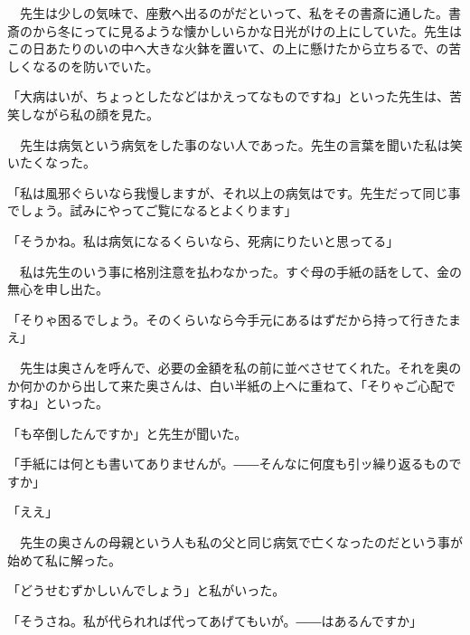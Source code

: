 \documentclass[a4j,onecolumn]{tarticle}
\begin{document}
　先生は少しの気味で、\hbox{}座敷へ出るのがだといって、\hbox{}私をその書斎に通した。\hbox{}書斎のから冬にってに見るような懐かしいらかな日光がけの上にしていた。\hbox{}先生はこの日あたりのいの中へ大きな火鉢を置いて、\hbox{}の上に懸けたから立ちるで、\hbox{}の苦しくなるのを防いでいた。\hbox{}\par{}
「大病はいが、\hbox{}ちょっとしたなどはかえってなものですね」といった先生は、\hbox{}苦笑しながら私の顔を見た。\hbox{}\par{}
　先生は病気という病気をした事のない人であった。\hbox{}先生の言葉を聞いた私は笑いたくなった。\hbox{}\par{}
「私は風邪ぐらいなら我慢しますが、\hbox{}それ以上の病気はです。\hbox{}先生だって同じ事でしょう。\hbox{}試みにやってご覧になるとよくります」\par{}
「そうかね。\hbox{}私は病気になるくらいなら、\hbox{}死病にりたいと思ってる」\par{}
　私は先生のいう事に格別注意を払わなかった。\hbox{}すぐ母の手紙の話をして、\hbox{}金の無心を申し出た。\hbox{}\par{}
「そりゃ困るでしょう。\hbox{}そのくらいなら今手元にあるはずだから持って行きたまえ」\par{}
　先生は奥さんを呼んで、\hbox{}必要の金額を私の前に並べさせてくれた。\hbox{}それを奥のか何かのから出して来た奥さんは、\hbox{}白い半紙の上へに重ねて、\hbox{}「そりゃご心配ですね」といった。\hbox{}\par{}
「も卒倒したんですか」と先生が聞いた。\hbox{}\par{}
「手紙には何とも書いてありませんが。\hbox{}――そんなに何度も引ッ繰り返るものですか」\par{}
「ええ」\par{}
　先生の奥さんの母親という人も私の父と同じ病気で亡くなったのだという事が始めて私に解った。\hbox{}\par{}
「どうせむずかしいんでしょう」と私がいった。\hbox{}\par{}
「そうさね。\hbox{}私が代られれば代ってあげてもいが。\hbox{}――はあるんですか」\par{}
\end{document}
